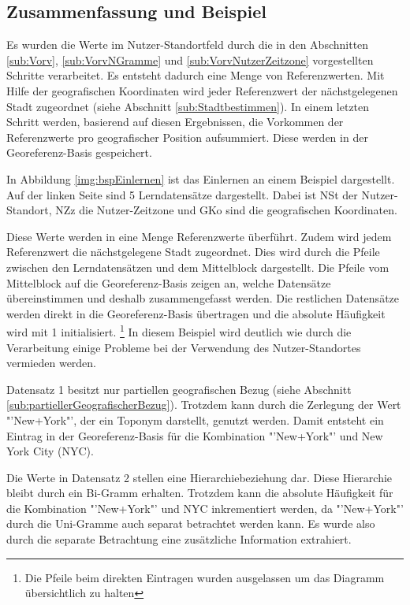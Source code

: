 		\subsection{Zusammenfassung und Beispiel}

			Es wurden die Werte im Nutzer-Standortfeld durch die in den Abschnitten \ref{sub:Vorv}, \ref{sub:VorvNGramme} und \ref{sub:VorvNutzerZeitzone} vorgestellten Schritte verarbeitet.
			Es entsteht dadurch eine Menge von Referenzwerten.
			Mit Hilfe der geografischen Koordinaten wird jeder Referenzwert der nächstgelegenen Stadt zugeordnet (siehe Abschnitt \ref{sub:Stadtbestimmen}). 
			In einem letzten Schritt werden, basierend auf diesen Ergebnissen, die Vorkommen der Referenzwerte pro geografischer Position aufsummiert.
			Diese werden in der Georeferenz-Basis gespeichert.

			In Abbildung \ref{img:bspEinlernen} ist das Einlernen an einem Beispiel dargestellt.
			Auf der linken Seite sind 5 Lerndatensätze dargestellt.
			Dabei ist NSt der Nutzer-Standort, NZz die Nutzer-Zeitzone und GKo sind die geografischen Koordinaten.
			
			Diese Werte werden in eine Menge Referenzwerte überführt.
			Zudem wird jedem Referenzwert die nächstgelegene Stadt zugeordnet.
			Dies wird durch die Pfeile zwischen den Lerndatensätzen und dem Mittelblock dargestellt.
			Die Pfeile vom Mittelblock auf die Georeferenz-Basis zeigen an, welche Datensätze übereinstimmen und deshalb zusammengefasst werden. 
			Die restlichen Datensätze werden direkt in die Georeferenz-Basis übertragen und die absolute Häufigkeit wird mit 1 initialisiert. \footnote{Die Pfeile beim direkten Eintragen wurden ausgelassen um das Diagramm übersichtlich zu halten} 
			In diesem Beispiel wird deutlich wie durch die Verarbeitung einige Probleme bei der Verwendung des Nutzer-Standortes vermieden werden.

			Datensatz 1 besitzt nur partiellen geografischen Bezug (siehe Abschnitt \ref{sub:partiellerGeografischerBezug}). 
			Trotzdem kann durch die Zerlegung der Wert "'New+York"', der ein Toponym darstellt, genutzt werden.
			Damit entsteht ein Eintrag in der Georeferenz-Basis für die Kombination "'New+York"' und New York City (NYC).

			Die Werte in Datensatz 2 stellen eine Hierarchiebeziehung dar.
			Diese Hierarchie bleibt durch ein Bi-Gramm erhalten.
			Trotzdem kann die absolute Häufigkeit für die Kombination "'New+York"' und NYC inkrementiert werden, da "'New+York"' durch die Uni-Gramme auch separat betrachtet werden kann.
			Es wurde also durch die separate Betrachtung eine zusätzliche Information extrahiert.

